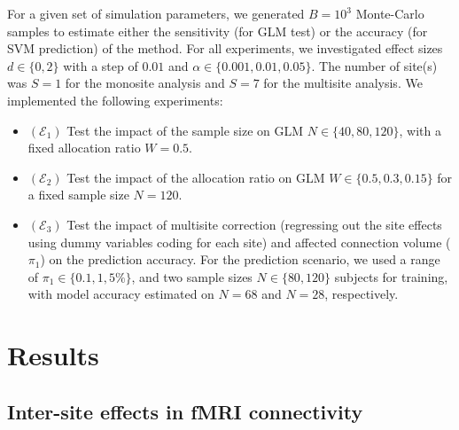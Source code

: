 \documentclass[authoryear]{elsarticle}
\begin{document}
For a given set of simulation parameters, we generated $B=10^3$ Monte-Carlo
samples to estimate either the sensitivity (for GLM test) or the accuracy (for
SVM prediction) of the method. For all experiments, we investigated effect sizes
$d\in\{0,2\}$ with a step of $0.01$ and $\alpha\in\{0.001,0.01,0.05\}$. The
number of site(s) was $S=1$ for the monosite analysis and $S=7$ for the
multisite analysis. We implemented the following experiments:

\begin{itemize}
\item $(\mathcal{E}_1)$ Test the impact of the sample size on GLM
$N\in\{40,80,120\}$, with a fixed allocation ratio $W=0.5$.
\item $(\mathcal{E}_2)$ Test the impact of the allocation ratio on GLM
$W\in\{0.5,0.3,0.15\}$ for a fixed sample size $N=120$.
\item $(\mathcal{E}_3)$ Test the impact of multisite correction (regressing out the site effects using dummy variables coding for each site) and affected
connection volume ($\pi_1$) on the prediction accuracy. For the prediction
scenario, we used a range of $\pi_1\in\{0.1,1,5\%\}$, and two sample sizes
$N\in\{80,120\}$ subjects for training, with model accuracy estimated on $N=68$
and $N=28$, respectively.
\end{itemize}


\section{Results}

\subsection{Inter-site effects in fMRI connectivity}
\end{document}
